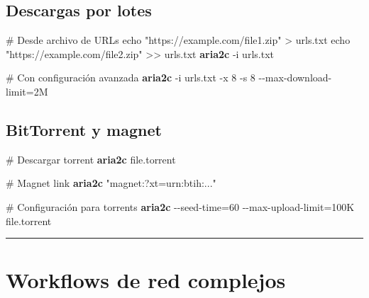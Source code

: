 \documentclass[
  11pt,
  letterpaper,
  oneside,
  openany]{scrbook}
\newenvironment{Shaded}{}{}
\newcommand{\AttributeTok}[1]{\textcolor[rgb]{0.84,0.23,0.29}{#1}}
\newcommand{\BuiltInTok}[1]{\textcolor[rgb]{0.84,0.23,0.29}{#1}}
\newcommand{\CommentTok}[1]{\textcolor[rgb]{0.42,0.45,0.49}{#1}}
\newcommand{\ExtensionTok}[1]{\textcolor[rgb]{0.84,0.23,0.29}{\textbf{#1}}}
\newcommand{\NormalTok}[1]{\textcolor[rgb]{0.14,0.16,0.18}{#1}}
\newcommand{\OperatorTok}[1]{\textcolor[rgb]{0.14,0.16,0.18}{#1}}
\newcommand{\StringTok}[1]{\textcolor[rgb]{0.01,0.18,0.38}{#1}}
\begin{document}
\subsection{Descargas por lotes}\label{descargas-por-lotes}

\begin{Shaded}
\begin{Highlighting}[]
\CommentTok{\# Desde archivo de URLs}
\BuiltInTok{echo} \StringTok{"https://example.com/file1.zip"} \OperatorTok{\textgreater{}}\NormalTok{ urls.txt}
\BuiltInTok{echo} \StringTok{"https://example.com/file2.zip"} \OperatorTok{\textgreater{}\textgreater{}}\NormalTok{ urls.txt}
\ExtensionTok{aria2c} \AttributeTok{{-}i}\NormalTok{ urls.txt}

\CommentTok{\# Con configuración avanzada}
\ExtensionTok{aria2c} \AttributeTok{{-}i}\NormalTok{ urls.txt }\AttributeTok{{-}x}\NormalTok{ 8 }\AttributeTok{{-}s}\NormalTok{ 8 }\AttributeTok{{-}{-}max{-}download{-}limit}\OperatorTok{=}\NormalTok{2M}
\end{Highlighting}
\end{Shaded}

\subsection{BitTorrent y magnet}\label{bittorrent-y-magnet}

\begin{Shaded}
\begin{Highlighting}[]
\CommentTok{\# Descargar torrent}
\ExtensionTok{aria2c}\NormalTok{ file.torrent}

\CommentTok{\# Magnet link}
\ExtensionTok{aria2c} \StringTok{"magnet:?xt=urn:btih:..."}

\CommentTok{\# Configuración para torrents}
\ExtensionTok{aria2c} \AttributeTok{{-}{-}seed{-}time}\OperatorTok{=}\NormalTok{60 }\AttributeTok{{-}{-}max{-}upload{-}limit}\OperatorTok{=}\NormalTok{100K file.torrent}
\end{Highlighting}
\end{Shaded}

\begin{center}\rule{0.5\linewidth}{0.5pt}\end{center}

\section{Workflows de red complejos}\label{workflows-de-red-complejos}
\end{document}
